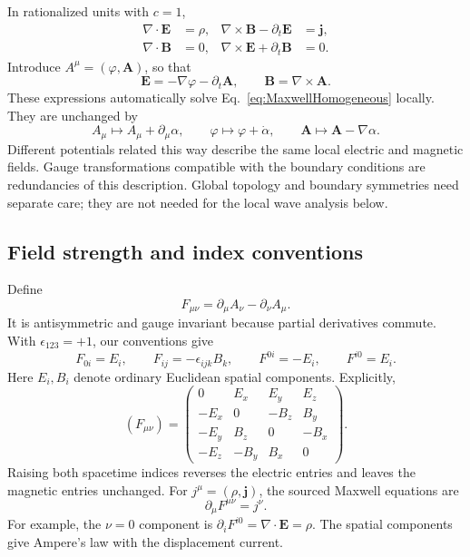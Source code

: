 \documentclass[11pt]{article}
\begin{document}
In rationalized units with \(c=1\),
\begin{align}
\nabla\cdot\bm E&=\rho,&
\nabla\times\bm B-\partial_t\bm E&=\bm j,\label{eq:MaxwellSources}\\
\nabla\cdot\bm B&=0,&
\nabla\times\bm E+\partial_t\bm B&=0.\label{eq:MaxwellHomogeneous}
\end{align}
Introduce \(A^\mu=(\varphi,\bm A)\), so that
\begin{equation}
\bm E=-\nabla\varphi-\partial_t\bm A,
\qquad \bm B=\nabla\times\bm A.
\label{eq:potentials}
\end{equation}
These expressions automatically solve Eq.~\eqref{eq:MaxwellHomogeneous}
locally. They are unchanged by
\begin{equation}
A_\mu\longmapsto A_\mu+\partial_\mu\alpha,
\qquad
\varphi\longmapsto\varphi+\dot\alpha,
\qquad
\bm A\longmapsto\bm A-\nabla\alpha.
\label{eq:gauge}
\end{equation}
Different potentials related this way describe the same local electric and
magnetic fields. Gauge transformations compatible with the boundary
conditions are redundancies of this description. Global topology and
boundary symmetries need separate care; they are not needed for the local
wave analysis below.

\subsection{Field strength and index conventions}

Define
\begin{equation}
F_{\mu\nu}=\partial_\mu A_\nu-\partial_\nu A_\mu.
\label{eq:F}
\end{equation}
It is antisymmetric and gauge invariant because partial derivatives commute.
With \(\epsilon_{123}=+1\), our conventions give
\begin{equation}
F_{0i}=E_i,\qquad F_{ij}=-\epsilon_{ijk}B_k,
\qquad F^{0i}=-E_i,\qquad F^{i0}=E_i.
\end{equation}
Here \(E_i,B_i\) denote ordinary Euclidean spatial components. Explicitly,
\begin{equation}
(F_{\mu\nu})=
\begin{pmatrix}
0&E_x&E_y&E_z\\
-E_x&0&-B_z&B_y\\
-E_y&B_z&0&-B_x\\
-E_z&-B_y&B_x&0
\end{pmatrix}.
\label{eq:Fmatrix}
\end{equation}
Raising both spacetime indices reverses the electric entries and leaves the
magnetic entries unchanged. For \(j^\mu=(\rho,\bm j)\), the sourced Maxwell
equations are
\begin{equation}
\boxed{\partial_\mu F^{\mu\nu}=j^\nu.}
\label{eq:covMaxwell}
\end{equation}
For example, the \(\nu=0\) component is
\(\partial_iF^{i0}=\nabla\cdot\bm E=\rho\). The spatial components give
Ampere's law with the displacement current.
\end{document}
